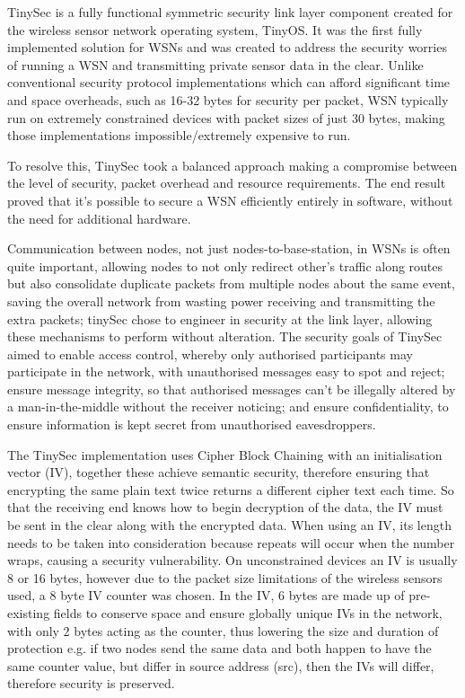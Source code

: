TinySec is a fully functional symmetric security link layer component created for the wireless sensor network operating system, TinyOS. It was the first fully implemented solution for WSNs and was created to address the security worries of running a WSN and transmitting private sensor data in the clear. Unlike conventional security protocol implementations which can afford significant time and space overheads, such as 16-32 bytes for security per packet, WSN typically run on extremely constrained devices with packet sizes of just 30 bytes, making those implementations impossible/extremely expensive to run.

To resolve this, TinySec took a balanced approach making a compromise between the level of security, packet overhead and resource requirements. The end result proved that it's possible to secure a WSN efficiently entirely in software, without the need for additional hardware. 

Communication between nodes, not just nodes-to-base-station, in WSNs is often quite important, allowing nodes to not only redirect other's traffic along routes but also consolidate duplicate packets from multiple nodes about the same event, saving the overall network from wasting power receiving and transmitting the extra packets; tinySec chose to engineer in security at the link layer, allowing these mechanisms to perform without alteration. The security goals of TinySec aimed to enable access control, whereby only authorised participants may participate in the network, with unauthorised messages easy to spot and reject; ensure message integrity, so that authorised messages can't be illegally altered by a man-in-the-middle without the receiver noticing; and ensure confidentiality, to ensure information is kept secret from unauthorised eavesdroppers. 

The TinySec implementation uses Cipher Block Chaining with an initialisation vector (IV), together these achieve semantic security, therefore ensuring that encrypting the same plain text twice returns a different cipher text each time. So that the receiving end knows how to begin decryption of the data, the IV must be sent in the clear along with the encrypted data. When using an IV, its length needs to be taken into consideration because repeats will occur when the number wraps, causing a security vulnerability. On unconstrained devices an IV is usually 8 or 16 bytes, however due to the packet size limitations of the wireless sensors used, a 8 byte IV counter was chosen. In the IV, 6 bytes are made up of pre-existing fields to conserve space and ensure globally unique IVs in the network, with only 2 bytes acting as the counter, thus lowering the size and duration of protection e.g. if two nodes send the same data and both happen to have the same counter value, but differ in source address (src), then the IVs will differ, therefore security is preserved.

